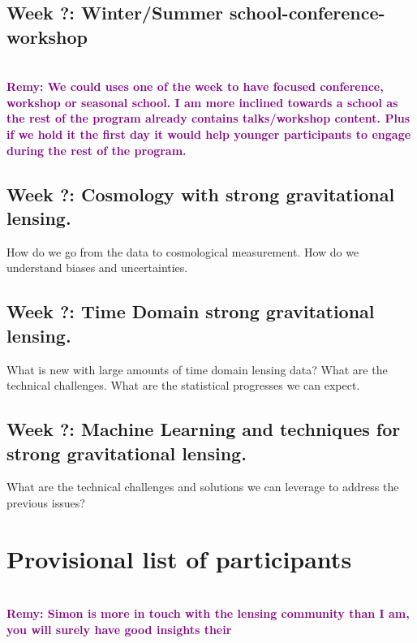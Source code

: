 \documentclass[11pt, letterpaper]{article}
\newcommand{\notesRemy}[1]{\textcolor{purple}{\bf \\  Remy: #1}}
\begin{document}
    \subsection{Week ?: Winter/Summer school-conference-workshop}
        \notesRemy{We could uses one of the week to have focused conference, workshop or seasonal school. I am more inclined towards a school as the rest of the program already contains talks/workshop content. Plus if we hold it the first day it would help younger participants to engage during the rest of the program.}
    
    \subsection{Week ?: Cosmology with strong gravitational lensing.}
        How do we go from the data to cosmological measurement. How do we understand biases and uncertainties.
    \subsection{Week ?: Time Domain strong gravitational lensing.}
        What is new with large amounts of time domain lensing data? What are the technical challenges. What are the statistical progresses we can expect.
    \subsection{Week ?: Machine Learning and techniques for strong gravitational lensing.}
        What are the technical challenges and solutions we can leverage to address the previous issues?

\section{Provisional list of participants}

\notesRemy{Simon is more in touch with the lensing community than I am, you will surely have good insights their}



\end{document}
